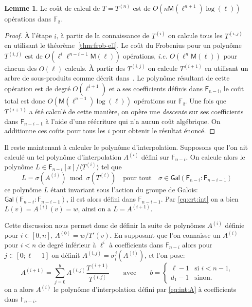 \documentclass[10pt,a4paper]{book}
\theoremstyle{plain}
\theoremstyle{definition}
\theoremstyle{definition}
\newtheorem{lem}[thm]{Lemme}
\theoremstyle{definition}
\theoremstyle{definition}
\theoremstyle{definition}
\theoremstyle{remark}
\theoremstyle{remark}
\theoremstyle{definition}
\begin{document}
\begin{lem}\label{lemma:interpolation:minpoly}
  Le coût de calcul de $T=T^{(n)}$ est de $O(n\mathsf{M}(\ell^{n+1})\log(\ell))$
  opérations dans $\mathbb{F}_q$.
\end{lem}

\begin{proof}
  \`A l'étape $i$, à partir de la connaissance de $T^{(i)}$ on  calcule tous 
  les $T^{(i,j)}$ en utilisant le théorème~\ref{thm:frob-ell}. Le coût du 
  Frobenius pour un polynôme $T^{(i,j)}$ est de 
  $O(\ell^i\ell^{n-i-1}\mathsf{M}(\ell))$ opérations,
  \emph{i.e.} $O(\ell^n\mathsf{M}(\ell))$ pour chacun des $O(\ell)$ calculs.
  \`A partir des $T^{(i,j)}$ on calcule $T^{(i+1)}$ en utilisant un arbre de 
  sous-produits comme décrit dans~\cite[Lemma~10.4]{vzGJG03}. Le polynôme 
  résultant de cette opération est de degré $O(\ell^{i+1})$ et a ses 
  coefficients définis dans $\mathsf{F}_{n-i}$, le coût total est donc 
  $O(\mathsf{M}(\ell^{n+1})\log(\ell))$ opérations sur $\mathbb{F}_q$. Une fois
   que $T^{(i+1)}$ a été calculé de cette manière, on opère une \emph{descente}
  sur ses coefficients dans $\mathsf{F}_{n-i-1}$ à l'aide d'une réécriture 
  qui n'a aucun coût algébrique.
  On additionne ces coûts pour tous les $i$ pour obtenir le résultat 
  énoncé. 
\end{proof}

Il reste maintenant à calculer le polynôme d'interpolation. Supposons que l'on 
ait calculé un tel polynôme d'interpolation $A^{(i)}$ défini sur 
$\mathsf{F}_{n-i}$. On calcule alors le polynôme $L \in \mathsf{F}_{n-i}[x]/ 
\langle T^{(i)} \rangle$ tel que 
\begin{equation}
\label{eq:crt:int}
L= \sigma(A^{(i)}) \bmod \sigma(T^{(i)}) \quad \text{pour tout} \quad \sigma \in 
\mathsf{Gal}(\mathsf{F}_{n-i}: \mathsf{F}_{n-i-1}) 
\end{equation} 
ce polynôme $L$ étant invariant sous l'action du groupe de Galois: 
$\mathsf{Gal}(\mathsf{F}_{n-i}: \mathsf{F}_{n-i-1})$, il est alors défini dans
 $\mathsf{F}_{n-i-1}$. Par \ref{eq:crt:int} on a bien $L(v)=A^{(i)}(v)=w$, 
 ainsi on a $L=A^{(i+1)}$. 
 
 Cette discussion nous permet donc de définir la suite de polynômes $A^{(i)}$ 
 définie pour $i \in [0, n]$, $A^{(0)}=w/T'(v)$. En 
 supposant que l'on connaisse un $A^{(i)}$ pour $i < n$ de degré inférieur à $\ell^i$ à 
 coefficients dans $\mathsf{F}_{n-i}$ alors pour $j \in [0 ; \ell-1]$ on définit
 $A^{(i,j)}=\sigma_i^j(A^{(i)})$, et l'on pose:  
\begin{equation*}
A^{(i+1)}=\sum_{j=0}^{b}A^{(i,j)}\frac{T^{(i+1)}}{T^{(i,j)}} \qquad\text{avec}\qquad
  b = \begin{cases}
    \ell-1 &\text{si $i<n-1$,}\\
    d_1 -1 &\text{sinon.}
  \end{cases}
\end{equation*}
on a alors $A^{(i)}$ le polynôme d'interpolation défini par \ref{eq:int:A} 
à coefficients dans $\mathsf{F}_{n-i}$.
\end{document}
